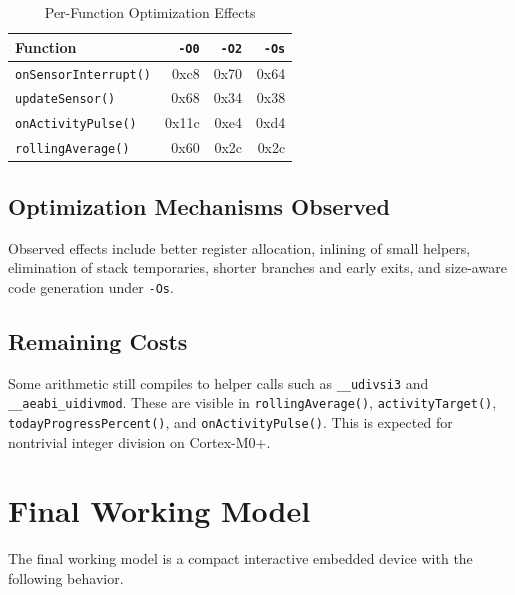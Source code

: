 \documentclass[conference]{IEEEtran}
\begin{document}
\begin{table}[!t]
\caption{Per-Function Optimization Effects}
\label{tab:function-size}
\centering
\scriptsize
\begin{tabular}{|l|r|r|r|}
\hline
\textbf{Function} & \textbf{\texttt{-O0}} & \textbf{\texttt{-O2}} & \textbf{\texttt{-Os}} \\
\hline
\texttt{onSensorInterrupt()} & 0xc8 & 0x70 & 0x64 \\
\hline
\texttt{updateSensor()} & 0x68 & 0x34 & 0x38 \\
\hline
\texttt{onActivityPulse()} & 0x11c & 0xe4 & 0xd4 \\
\hline
\texttt{rollingAverage()} & 0x60 & 0x2c & 0x2c \\
\hline
\end{tabular}
\normalsize
\end{table}

\subsection{Optimization Mechanisms Observed}
Observed effects include better register allocation, inlining of small helpers, elimination of stack temporaries, shorter branches and early exits, and size-aware code generation under \texttt{-Os}.

\subsection{Remaining Costs}
Some arithmetic still compiles to helper calls such as \texttt{\_\_udivsi3} and \texttt{\_\_aeabi\_uidivmod}. These are visible in \texttt{rollingAverage()}, \texttt{activityTarget()}, \texttt{todayProgressPercent()}, and \texttt{onActivityPulse()}. This is expected for nontrivial integer division on Cortex-M0+.

\section{Final Working Model}
The final working model is a compact interactive embedded device with the following behavior.
\end{document}
